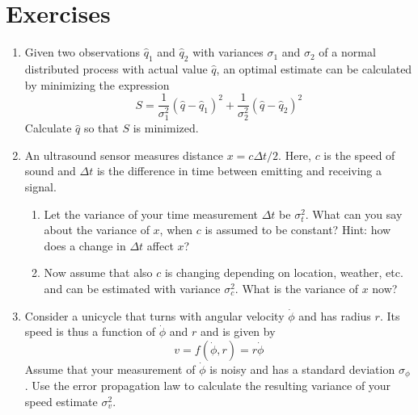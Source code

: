 \section*{Exercises}\small
\begin{enumerate}
\item Given two observations $\hat{q}_1$ and $\hat{q}_2$ with variances $\sigma_1$ and $\sigma_2$ of a normal distributed process with actual value $\hat{q}$, an optimal estimate can be calculated by minimizing the expression
\begin{equation}
\nonumber
S=\frac{1}{\sigma_1^2}(\hat{q}-\hat{q}_1)^2+\frac{1}{\sigma_2^2}(\hat{q}-\hat{q}_2)^2
\end{equation}
Calculate $\hat{q}$ so that $S$ is minimized.
\item An ultrasound sensor measures distance $x=c\Delta t/2$. Here, $c$ is the speed of sound and $\Delta t$ is the difference in time between emitting and receiving a signal.
\begin{enumerate}
\item Let the variance of your time measurement $\Delta t$ be $\sigma_t^2$. What can you say about the variance of $x$, when $c$ is assumed to be constant? Hint: how does a change in $\Delta t$ affect $x$?
\item Now assume that also $c$ is changing depending on location, weather, etc. and can be estimated with variance $\sigma_c^2$. What is the variance of $x$ now?
\end{enumerate}
\item Consider a unicycle that turns with angular velocity $\dot{\phi}$ and has radius $r$. Its speed is thus a function of $\dot{\phi}$ and $r$ and is given by
\begin{equation}
\nonumber
v=f(\dot{\phi},r)=r\dot{\phi}
\end{equation} 
Assume that your measurement of $\dot{\phi}$ is noisy and has a standard deviation $\sigma_{\phi}$.  Use the error propagation law to calculate the resulting variance of your speed estimate $\sigma_v^2$. 
\end{enumerate}
\normalsize